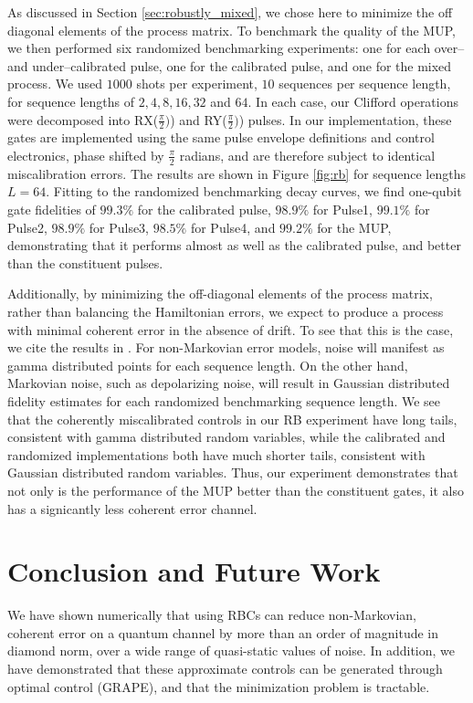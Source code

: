 \documentclass[aps,nofootinbib,pra,notitlepage,twocolumn]{revtex4-1}
\begin{document}
As discussed in Section \ref{sec:robustly_mixed}, we chose here to minimize the off diagonal elements of the process matrix. To benchmark the quality of the MUP, we then performed six randomized benchmarking experiments\cite{Magesan2011}: one for each over-- and under--calibrated pulse, one for the calibrated pulse, and one for the mixed process. We used $1000$ shots per experiment, $10$ sequences per sequence length, for sequence lengths of $2, 4, 8, 16, 32$ and $64$. In each case, our Clifford operations were decomposed into RX($\frac{\pi}{2})$) and RY($\frac{\pi}{2})$) pulses. In our implementation, these gates are implemented using the same pulse envelope definitions and control electronics, phase shifted by $\frac{\pi}{2}$ radians, and are therefore subject to identical miscalibration errors. The results are shown in Figure \ref{fig:rb} for sequence lengths $L=64$. Fitting to the randomized benchmarking decay curves, we find one-qubit gate fidelities of $99.3\%$ for the calibrated pulse, $98.9\%$ for Pulse1, $99.1\%$ for Pulse2, $98.9\%$ for Pulse3, $98.5\%$ for Pulse4, and $99.2\%$ for the MUP, demonstrating that it performs almost as well as the calibrated pulse, and better than the constituent pulses. 

Additionally, by minimizing the off-diagonal elements of the process matrix, rather than balancing the Hamiltonian errors, we expect to produce a process with minimal coherent error in the absence of drift. To see that this is the case, we cite the results in \cite{Ball2016}. For non-Markovian error models, noise will manifest as gamma distributed points for each sequence length. On the other hand, Markovian noise, such as depolarizing noise, will result in Gaussian distributed fidelity estimates for each randomized benchmarking sequence length. We see that the coherently miscalibrated controls in our RB experiment have long tails, consistent with gamma distributed random variables, while the calibrated and randomized implementations both have much shorter tails, consistent with Gaussian distributed random variables. Thus, our experiment demonstrates that not only is the performance of the MUP better than the constituent gates, it also has a signicantly less coherent error channel.




\section{Conclusion and Future Work}
We have shown numerically that using RBCs can reduce non-Markovian, coherent error on a quantum channel by more than an order of magnitude in diamond norm, over a wide range of quasi-static values of noise. In addition, we have demonstrated that these approximate controls can be generated through optimal control (GRAPE), and that the minimization problem is tractable.
\end{document}
